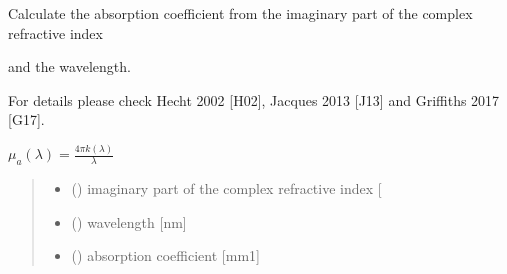 \documentclass[letterpaper,10pt,english]{sphinxmanual}
\begin{document}

\begin{fulllineitems}
\label{\detokenize{03_absorption_coefficient:skinoptics.absorption_coefficient.mua_from_k}}
\pysigstartsignatures
{}
\pysigstopsignatures
\begin{DUlineblock}{0em}
\item[] Calculate the absorption coefficient from the imaginary part of the complex refractive index
\item[] and the wavelength.
\item[] For details please check Hecht 2002 {[}H02{]}, Jacques 2013 {[}J13{]} and Griffiths 2017 {[}G17{]}.
\end{DUlineblock}

\sphinxAtStartPar
\(\mu_a(\lambda) = \frac{4\pi k(\lambda)}{\lambda}\)
\begin{quote}\begin{description}
\begin{itemize}
\item {} 
\sphinxAtStartPar
{} () \textendash{} imaginary part of the complex refractive index {[}\sphinxhyphen{}{]}

\item {} 
\sphinxAtStartPar
{} () \textendash{} wavelength {[}nm{]}

\end{itemize}

\sphinxAtStartPar
\begin{itemize}
\item {} 
\sphinxAtStartPar
{} () \textendash{} absorption coefficient {[}mm\sphinxhyphen{}1{]}

\end{itemize}


\end{description}\end{quote}

\end{fulllineitems}
\end{document}
